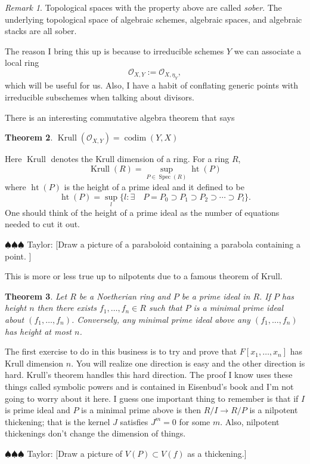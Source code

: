 \documentclass[12pt]{article}
\numberwithin{equation}{section}
\newtheorem{theorem}{Theorem}[subsection]
\theoremstyle{definition}
\theoremstyle{remark}
\newtheorem{remark}[theorem]{Remark}
\newcommand{\Ocal}{\mathcal{O}}
\newcommand{\Spec}{\operatorname{Spec}}
\newcommand{\codim}{\operatorname{codim}}
\newcommand{\Krull}{\operatorname{Krull}}
\newcommand{\height}{\operatorname{ht}}
\newcommand{\taylor}[1]{{\color{blue} \sf $\spadesuit\spadesuit\spadesuit$ Taylor: [#1]}}
\begin{document}
\begin{remark}
Topological spaces with the property above are called \emph{sober}. 
The underlying topological space of algebraic schemes, algebraic spaces, and algebraic stacks are all sober. 
\end{remark}
The reason I bring this up is because to irreducible schemes $Y$ we can associate a local ring
 $$ \Ocal_{X,Y} := \Ocal_{X,\eta_Y},$$
which will be useful for us. Also, I have a habit of conflating generic points with irreducible subschemes when talking about divisors. 

There is an interesting commutative algebra theorem that says 
\begin{theorem}
	$\Krull(\Ocal_{X,Y}) = \codim(Y,X)$ 
\end{theorem}
Here $\Krull$ denotes the Krull dimension of a ring. 
For a ring $R$, 
$$ \Krull(R) = \sup_{P \in \Spec(R)} \height(P) $$
where $\height(P)$ is the height of a prime ideal and it defined to be 
 $$ \height(P) = \sup_l \lbrace l \colon \exists \quad P = P_0 \supset P_1 \supset P_2 \supset \cdots \supset P_l \rbrace. $$
One should think of the height of a prime ideal as the number of equations needed to cut it out. 

\taylor{Draw a picture of a paraboloid containing a parabola containing a point. }

This is more or less true up to nilpotents due to a famous theorem of Krull. 
\begin{theorem}
	Let $R$ be a Noetherian ring and $P$ be a prime ideal in $R$. 
	If $P$ has height $n$ then there exists $f_1,\ldots,f_n\in R$ such that $P$ is a minimal prime ideal about $(f_1,\ldots,f_n)$. 
	Conversely, any minimal prime ideal above any $(f_1,\ldots,f_n)$ has height at most $n$.
\end{theorem}
The first exercise to do in this business is to try and prove that $F[x_1,\ldots,x_n]$ has Krull dimension $n$.
You will realize one direction is easy and the other direction is hard. 
Krull's theorem handles this hard direction. 
The proof I know uses these things called symbolic powers and is contained in Eisenbud's book and I'm not going to worry about it here.
I guess one important thing to remember is that if $I$ is prime ideal and $P$ is a minimal prime above is then $R/I \to R/P$ is a nilpotent thickening; that is the kernel $J$ satisfies $J^m=0$ for some $m$. 
Also, nilpotent thickenings don't change the dimension of things. 

\taylor{Draw a picture of $V(P) \subset V(f)$ as a thickening.}
\end{document}

